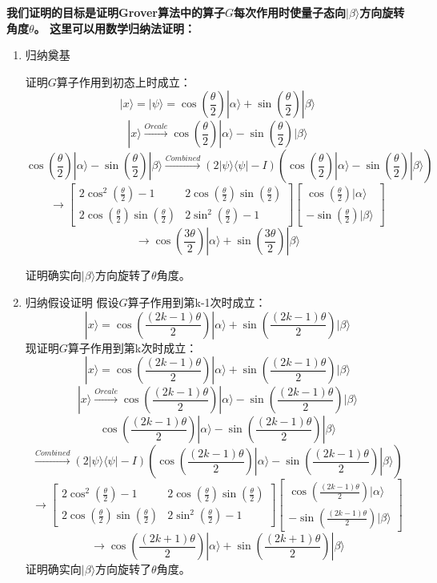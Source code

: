 \documentclass[11pt]{article}
\begin{document}
\textbf{我们证明的目标是证明Grover算法中的算子$G$每次作用时使量子态向$|\beta\rangle$方向旋转角度$\theta$。
这里可以用数学归纳法证明：}
\begin{enumerate}[(1)]
    \item 归纳奠基
    
    证明$G$算子作用到初态上时成立：
    \[|x\rangle = |\psi\rangle = \cos(\frac{\theta}{2}) |\alpha\rangle + \sin(\frac{\theta}{2}) |\beta\rangle\]
    \[|x\rangle \stackrel{Orcale}\longrightarrow  \cos(\frac{\theta}{2}) |\alpha\rangle - \sin(\frac{\theta}{2}) |\beta\rangle\]
    \[\cos(\frac{\theta}{2}) |\alpha\rangle - \sin(\frac{\theta}{2}) |\beta\rangle\stackrel{Combined}\longrightarrow \left(2|\psi\rangle\langle\psi| - I\right) \left(\cos(\frac{\theta}{2}) |\alpha\rangle - \sin(\frac{\theta}{2}) |\beta\rangle \right)\]
    \[\longrightarrow 
    \begin{bmatrix}
        2\cos^2(\frac{\theta}{2}) - 1 & 2\cos(\frac{\theta}{2})\sin(\frac{\theta}{2}) \\
        2\cos(\frac{\theta}{2})\sin(\frac{\theta}{2}) & 2\sin^2(\frac{\theta}{2}) - 1
    \end{bmatrix}
    \begin{bmatrix}
        \cos(\frac{\theta}{2})|\alpha\rangle \\
        -\sin(\frac{\theta}{2})|\beta\rangle
    \end{bmatrix}
    \]
    \[\longrightarrow
        \cos(\frac{3\theta}{2}) |\alpha\rangle + \sin(\frac{3\theta}{2}) |\beta\rangle
    \]

    证明确实向$|\beta\rangle$方向旋转了$\theta$角度。
    
    \item 归纳假设证明
    假设$G$算子作用到第k-1次时成立：
    \[|x\rangle = \cos(\frac{(2k-1)\theta}{2}) |\alpha\rangle + \sin(\frac{(2k-1)\theta}{2}) |\beta\rangle\]
    现证明$G$算子作用到第k次时成立：
    \[|x\rangle = \cos(\frac{(2k-1)\theta}{2}) |\alpha\rangle + \sin(\frac{(2k-1)\theta}{2}) |\beta\rangle\]
    \[|x\rangle \stackrel{Orcale}\longrightarrow  \cos(\frac{(2k-1)\theta}{2}) |\alpha\rangle - \sin(\frac{(2k-1)\theta}{2}) |\beta\rangle\]    
    \[ \cos(\frac{(2k-1)\theta}{2}) |\alpha\rangle - \sin(\frac{(2k-1)\theta}{2}) |\beta\rangle\]
    \[\stackrel{Combined}\longrightarrow \left(2|\psi\rangle\langle\psi| - I\right) \left(\cos(\frac{(2k-1)\theta}{2}) |\alpha\rangle - \sin(\frac{(2k-1)\theta}{2}) |\beta\rangle \right)\]
    \[\longrightarrow 
    \begin{bmatrix}
        2\cos^2(\frac{\theta}{2}) - 1 & 2\cos(\frac{\theta}{2})\sin(\frac{\theta}{2}) \\
        2\cos(\frac{\theta}{2})\sin(\frac{\theta}{2}) & 2\sin^2(\frac{\theta}{2}) - 1
    \end{bmatrix}
    \begin{bmatrix}
        \cos(\frac{(2k-1)\theta}{2})|\alpha\rangle \\
        -\sin(\frac{(2k-1)\theta}{2})|\beta\rangle
    \end{bmatrix}
    \]
    \[\longrightarrow
        \cos(\frac{(2k+1)\theta}{2}) |\alpha\rangle + \sin(\frac{(2k+1)\theta}{2}) |\beta\rangle
    \]
    证明确实向$|\beta\rangle$方向旋转了$\theta$角度。
\end{enumerate}
\end{document}

